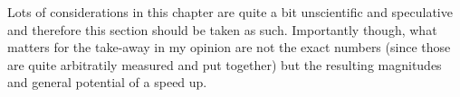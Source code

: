 Lots of considerations in this chapter are quite a bit unscientific and speculative and therefore this section should be taken as such. Importantly though, what matters for the take-away in my opinion are not the exact numbers (since those are quite arbitratily measured and put together) but the resulting magnitudes and general potential of a speed up.
